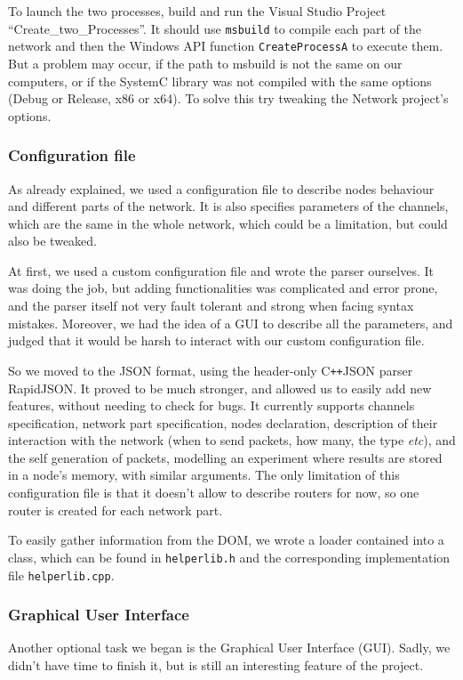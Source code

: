 \documentclass[12pt,a4paper]{article}
\newcommand{\Cpp}{C\texttt{++}}
\begin{document}
To launch the two processes, build and run the Visual Studio Project ``Create_two_Processes''. It should use \texttt{msbuild} to compile each part of the network and then the Windows API function \texttt{CreateProcessA} to execute them. But a problem may occur, if the path to msbuild is not the same on our computers, or if the SystemC library was not compiled with the same options (Debug or Release, x86 or x64). To solve this try tweaking the Network project's options.
\subsubsection*{Configuration file}
As already explained, we used a configuration file to describe nodes behaviour and different parts of the network. It is also specifies parameters of the channels, which are the same in the whole network, which could be a limitation, but could also be tweaked.

At first, we used a custom configuration file and wrote the parser ourselves. It was doing the job, but adding functionalities was complicated and error prone, and the parser itself not very fault tolerant and strong when facing syntax mistakes. Moreover, we had the idea of a GUI to describe all the parameters, and judged that it would be harsh to interact with our custom configuration file.

So we moved to the JSON format, using the header-only \Cpp JSON parser RapidJSON. It proved to be much stronger, and allowed us to easily add new features, without needing to check for bugs. It currently supports channels specification, network part specification, nodes declaration, description of their interaction with the network (when to send packets, how many, the type \textsl{etc}), and the self generation of packets, modelling an experiment where results are stored in a node's memory, with similar arguments. The only limitation of this configuration file is that it doesn't allow to describe routers for now, so one router is created for each network part. 

To easily gather information from the DOM, we wrote a loader contained into a class, which can be found in \texttt{helperlib.h} and the corresponding implementation file \texttt{helperlib.cpp}.

\subsubsection*{Graphical User Interface}
Another optional task we began is the Graphical User Interface (GUI). Sadly, we didn't have time to finish it, but is still an interesting feature of the project.
\end{document}
